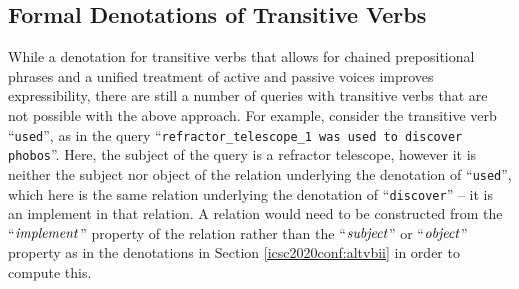 \documentclass[../main.tex]{subfiles}
\begin{document}
\begin{refsection}
\subsection{Formal Denotations of Transitive Verbs}

While a denotation for transitive verbs that allows for chained prepositional phrases and a unified treatment of active and passive voices improves expressibility, there are still a number of queries with transitive verbs that are not possible with the above approach. For example, consider the transitive verb ``\texttt{used}'', as in the query ``\texttt{refractor\_telescope\_1 was used to discover phobos}''.  Here, the subject of the query is a refractor telescope, however it is neither the subject nor object of the relation underlying the denotation of ``\texttt{used}'', which here is the same relation underlying the denotation of ``\texttt{discover}'' -- it is an implement in that relation.
A relation would need to be constructed from the ``$\operatorname{\mathit{implement}}$'' property of the relation rather than the ``$\operatorname{\mathit{subject}}$'' or ``$\operatorname{\mathit{object}}$'' property as in the denotations in Section \ref{icsc2020conf:altvbii} in order to compute this.

\newcommand{\mbinrel}[3]{\dmathrm{make\_binrel}({#1}, {#2}, {#3})}


\end{refsection}
\end{document}
